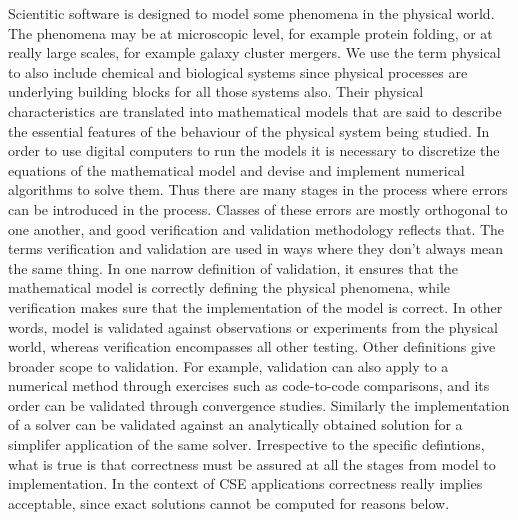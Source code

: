 \label{sec:vandv}

Scientitic software is designed to model some phenomena in the
physical world. The phenomena may be at microscopic level, for example
protein folding, or at really large scales, for example galaxy cluster
mergers. We use the term physical to also include chemical and
biological systems since physical processes are underlying building
blocks for all those systems also. 
Their physical characteristics are translated into
mathematical models that are said to describe the essential features
of the behaviour of the physical system being studied. In order to use
digital computers to run the models it is necessary to discretize the
equations of the mathematical model and devise and implement numerical
algorithms to solve them. Thus there are many stages in the process
where errors can be introduced in the process. Classes of these errors
are mostly orthogonal to one another, and good verification and
validation methodology reflects that. The terms verification and
validation are used in ways where they don't always mean the same
thing. In one narrow definition of validation, it ensures that the mathematical
model is correctly defining the physical phenomena, while verification
makes sure that the implementation of the model is correct. In other
words, model is validated against observations or experiments from the
physical world, whereas verification encompasses all other 
testing.   Other definitions give broader scope to validation. For
example, validation can also apply to a numerical method through
exercises such as code-to-code comparisons, and its order can be
validated through convergence studies. Similarly the implementation of
a solver can be validated against an analytically obtained solution
for a simplifer application of the same solver. Irrespective to the
specific defintions, what is true is that correctness must be assured
at all the stages from model to implementation. In the context of CSE
applications correctness really implies acceptable, since exact
solutions cannot be computed for reasons below. 

